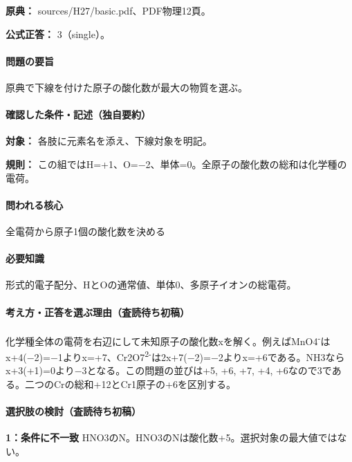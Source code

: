 \noindent\textbf{原典：} sources/H27/basic.pdf、PDF物理12頁。

\textbf{公式正答：} 3（single）。

\paragraph{問題の要旨} 原典で下線を付けた原子の酸化数が最大の物質を選ぶ。

\paragraph{確認した条件・記述（独自要約）}\mbox{}\par

\noindent\textbf{対象：} 各肢に元素名を添え、下線対象を明記。\par

\noindent\textbf{規則：} この組ではH=+1、O=−2、単体=0。全原子の酸化数の総和は化学種の電荷。\par

\paragraph{問われる核心} 全電荷から原子1個の酸化数を決める

\paragraph{必要知識} 形式的電子配分、HとOの通常値、単体0、多原子イオンの総電荷。

\paragraph{考え方・正答を選ぶ理由（査読待ち初稿）} 化学種全体の電荷を右辺にして未知原子の酸化数xを解く。例えばMnO4\textsuperscript{-}はx+4(−2)=−1よりx=+7、Cr2O7\textsuperscript{2-}は2x+7(−2)=−2よりx=+6である。NH3ならx+3(+1)=\allowbreak{}0より−3となる。この問題の並びは+5, +6, +7, +4, +6なので3である。二つのCrの総和+12とCr1原子の+6を区別する。

\paragraph{選択肢の検討（査読待ち初稿）}\mbox{}\par

\noindent\textbf{1：条件に不一致} HNO3のN。HNO3のNは酸化数+5。選択対象の最大値ではない。\par

